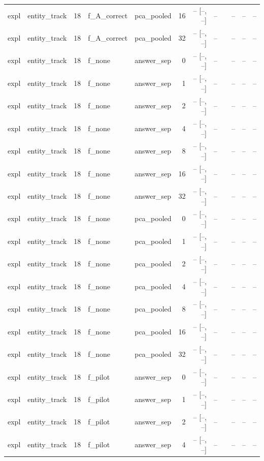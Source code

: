 \begin{tabular}{llrllrrrlrrr}
expl & entity\_track & 18 & f\_A\_correct & pca\_pooled & 16 & -- [--, --] & -- &  & -- & -- & -- \\
expl & entity\_track & 18 & f\_A\_correct & pca\_pooled & 32 & -- [--, --] & -- &  & -- & -- & -- \\
expl & entity\_track & 18 & f\_none & answer\_sep & 0 & -- [--, --] & -- &  & -- & -- & -- \\
expl & entity\_track & 18 & f\_none & answer\_sep & 1 & -- [--, --] & -- &  & -- & -- & -- \\
expl & entity\_track & 18 & f\_none & answer\_sep & 2 & -- [--, --] & -- &  & -- & -- & -- \\
expl & entity\_track & 18 & f\_none & answer\_sep & 4 & -- [--, --] & -- &  & -- & -- & -- \\
expl & entity\_track & 18 & f\_none & answer\_sep & 8 & -- [--, --] & -- &  & -- & -- & -- \\
expl & entity\_track & 18 & f\_none & answer\_sep & 16 & -- [--, --] & -- &  & -- & -- & -- \\
expl & entity\_track & 18 & f\_none & answer\_sep & 32 & -- [--, --] & -- &  & -- & -- & -- \\
expl & entity\_track & 18 & f\_none & pca\_pooled & 0 & -- [--, --] & -- &  & -- & -- & -- \\
expl & entity\_track & 18 & f\_none & pca\_pooled & 1 & -- [--, --] & -- &  & -- & -- & -- \\
expl & entity\_track & 18 & f\_none & pca\_pooled & 2 & -- [--, --] & -- &  & -- & -- & -- \\
expl & entity\_track & 18 & f\_none & pca\_pooled & 4 & -- [--, --] & -- &  & -- & -- & -- \\
expl & entity\_track & 18 & f\_none & pca\_pooled & 8 & -- [--, --] & -- &  & -- & -- & -- \\
expl & entity\_track & 18 & f\_none & pca\_pooled & 16 & -- [--, --] & -- &  & -- & -- & -- \\
expl & entity\_track & 18 & f\_none & pca\_pooled & 32 & -- [--, --] & -- &  & -- & -- & -- \\
expl & entity\_track & 18 & f\_pilot & answer\_sep & 0 & -- [--, --] & -- &  & -- & -- & -- \\
expl & entity\_track & 18 & f\_pilot & answer\_sep & 1 & -- [--, --] & -- &  & -- & -- & -- \\
expl & entity\_track & 18 & f\_pilot & answer\_sep & 2 & -- [--, --] & -- &  & -- & -- & -- \\
expl & entity\_track & 18 & f\_pilot & answer\_sep & 4 & -- [--, --] & -- &  & -- & -- & -- \\

\end{tabular}
